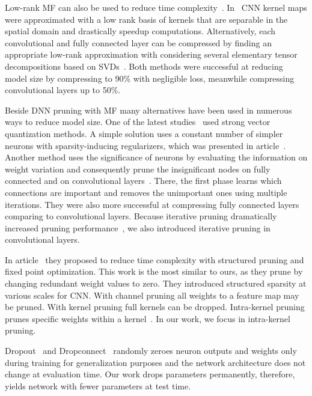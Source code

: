 \documentclass{article} %
\begin{document}
Low-rank MF can also be used to reduce time complexity~\cite{zhang2015efficient}.  
In~\cite{jaderberg2014speeding} CNN kernel maps were approximated with a low rank basis of
kernels that are separable in the spatial domain and drastically speedup computations.
Alternatively, each convolutional and fully connected layer can be compressed by finding 
an appropriate low-rank approximation with considering several elementary tensor 
decompositions based on SVDs~\cite{denton2014exploiting}. Both methods were successful at 
reducing model size by compressing to 90\% with negligible loss, meanwhile compressing 
convolutional layers up to 50\%.

Beside DNN pruning with MF many alternatives have been used in numerous ways to reduce 
model size. One of the latest studies~\cite{DBLP:journals/corr/GongLYB14} used strong 
vector quantization methods. A simple solution uses a constant number of simpler neurons 
with sparsity-inducing regularizers, which was presented in 
article~\cite{collins2014memory}. Another method uses the significance of neurons by  
evaluating the information on weight variation and consequently prune the insignificant
nodes on fully connected and on convolutional layers~\cite{han2015learning}. There, the 
first phase learns which connections are important and removes the unimportant ones using 
multiple iterations. They were also more successful at compressing fully connected layers
comparing to convolutional layers. Because iterative pruning dramatically increased 
pruning performance~\cite{han2015learning}, we also introduced iterative pruning in 
convolutional layers.

In article~\cite{anwar2015structured} they proposed to reduce time complexity with 
structured pruning and fixed point optimization. This work is the most similar to ours, as
they prune by changing redundant weight values to zero. They introduced structured 
sparsity at various scales for CNN. With channel pruning all weights to a feature map may 
be pruned. With kernel pruning full kernels can be dropped. Intra-kernel pruning prunes 
specific weights within a kernel~\cite{anwar2015structured}. In our work, we focus in 
intra-kernel pruning.

Dropout~\cite{srivastava2014dropout} and Dropconnect~\cite{wan2013regularization} randomly
zeroes neuron outputs and weights only during training for generalization purposes
and the network architecture does not change at evaluation time. Our work drops parameters
permanently, therefore, yields network with fewer parameters at test time.
\end{document}

